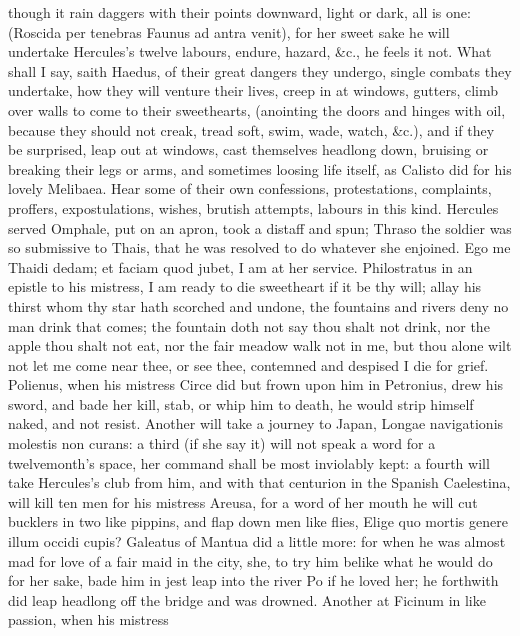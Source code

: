 {though it rain daggers with their points downward, light or dark, all
is one: (Roscida per tenebras Faunus ad antra venit), for her sweet
sake he will undertake Hercules's twelve labours, endure, hazard, \&c.,
he feels it not. What shall I say, saith Haedus, of their great
dangers they undergo, single combats they undertake, how they will
venture their lives, creep in at windows, gutters, climb over walls to
come to their sweethearts, (anointing the doors and hinges with oil,
because they should not creak, tread soft, swim, wade, watch, \&c.), and
if they be surprised, leap out at windows, cast themselves headlong
down, bruising or breaking their legs or arms, and sometimes loosing
life itself, as Calisto did for his lovely Melibaea. Hear some of their
own confessions, protestations, complaints, proffers, expostulations,
wishes, brutish attempts, labours in this kind. Hercules served
Omphale, put on an apron, took a distaff and spun; Thraso the soldier
was so submissive to Thais, that he was resolved to do whatever she
enjoined. Ego me Thaidi dedam; et faciam quod jubet, I am at her
service. Philostratus in an epistle to his mistress, I am ready
to die sweetheart if it be thy will; allay his thirst whom thy star
hath scorched and undone, the fountains and rivers deny no man drink
that comes; the fountain doth not say thou shalt not drink, nor the
apple thou shalt not eat, nor the fair meadow walk not in me, but thou
alone wilt not let me come near thee, or see thee, contemned and
despised I die for grief. Polienus, when his mistress Circe did but
frown upon him in Petronius, drew his sword, and bade her kill,
stab, or whip him to death, he would strip himself naked, and not
resist. Another will take a journey to Japan, Longae navigationis
molestis non curans: a third (if she say it) will not speak a word for
a twelvemonth's space, her command shall be most inviolably kept: a
fourth will take Hercules's club from him, and with that centurion in
the Spanish Caelestina, will kill ten men for his mistress
Areusa, for a word of her mouth he will cut bucklers in two like
pippins, and flap down men like flies, Elige quo mortis genere illum
occidi cupis? Galeatus of Mantua did a little more: for when he
was almost mad for love of a fair maid in the city, she, to try him
belike what he would do for her sake, bade him in jest leap into the
river Po if he loved her; he forthwith did leap headlong off the bridge
and was drowned. Another at Ficinum in like passion, when his mistress
}
